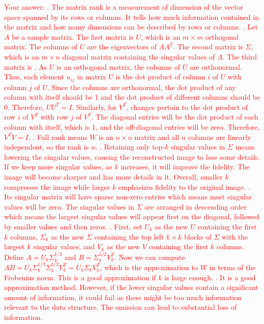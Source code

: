 \textcolor{red}{
Your answer: . The matrix rank is a measurement of dimension of the vector space spanned by its rows or columns. It tells how much information contained in the matrix and how many dimensions can be described by rows or columns.
. Let \( A \) be a sample matrix. The first matrix is \( U \), which is an \( m \times m \) orthogonal matrix. The columns of \( U \) are the eigenvectors of \( A A^T \). The second matrix is \( \Sigma \), which is an \( m \times n \) diagonal matrix containing the singular values of \( A \). The third matrix is
. As \( U \) is an orthogonal matrix, the columns of \( U \) are orthonormal. Thus, each element \( u_{ij} \) in matrix \( U \) is the dot product of column \( i \) of \( U \) with column \( j \) of \( U \). Since the columns are orthonormal, the dot product of any column with itself should be 1 and the dot product of different columns should be 0. Therefore, \( UU^T = I \). Similarly, for \( V^T \), changes pertain to the dot product of row \( i \) of \( V^T \) with row \( j \) of \( V^T \). The diagonal entries will be the dot product of each column with itself, which is 1, and the off-diagonal entries will be zero. Therefore, \( V^TV = I \).
. Full rank means \( W \) is an \( n \times n \) matrix and all \( n \) columns are linearly independent, so the rank is \( n \).
. Retaining only top-\( k \) singular values in \( \Sigma \) means lowering the singular values, causing the reconstructed image to lose some details. If we keep more singular values, as \( k \) increases, it will improve the fidelity. The image will become sharper and has more details in it. Overall, smaller \( k \) compresses the image while larger \( k \) emphasizes fidelity to the original image.
. Its singular matrix will have sparse non-zero entries which means most singular values will be zero. The singular values in \( \Sigma \) are arranged in descending order which means the largest singular values will appear first on the diagonal, followed by smaller values and then zeros.
. First, set \( U_k \) as the new \( U \) containing the first \( k \) columns, \( \Sigma_k \) as the new \( \Sigma \) containing the top left \( k \times k \) blocks of \( \Sigma \) with the largest \( k \) singular values, and \( V_k \) as the new \( V \) containing the first \( k \) columns. Define \( A = U_k \Sigma_k^{1/2} \) and \( B = \Sigma_k^{1/2} V_k^T \). Now we can compute \( AB = U_k \Sigma_k^{1/2} \Sigma_k^{1/2} V_k^T = U_k \Sigma_k V_k^T \), which is the approximation to \( W \) in terms of the Frobenius norm. This is a good approximation if \( k \) is large enough.
. It is a good approximation method. However, if the lower singular values contain a significant amount of information, it could fail as there might be too much information relevant to the data structure. The omission can lead to substantial loss of information.
}


